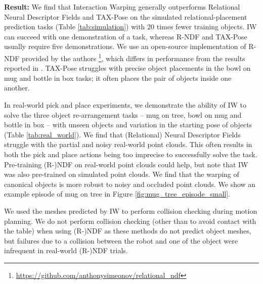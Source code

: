 \documentclass{article}
\newcommand{\ob}[1]{\textcolor{purple}{[\textbf{OB:} #1]}}
\begin{document}
\textbf{Result:} We find that Interaction Warping generally outperforms Relational Neural Descriptor Fields \cite{simeonov2022neural} and TAX-Pose \cite{pan22taxpose} on the simulated relational-placement prediction tasks (Table \ref{tab:simulation}) with 20 times fewer training objects. IW can succeed with one demonstration of a task, whereas R-NDF and TAX-Pose usually require five demonstrations. We use an open-source implementation of R-NDF provided by the authors \footnote{\url{https://github.com/anthonysimeonov/relational_ndf}}, which differs in performance from the results reported in \cite{simeonov22se}. TAX-Pose struggles with precise object placements in the bowl on mug and bottle in box tasks; it often places the pair of objects inside one another.

In real-world pick and place experiments, we demonstrate the ability of IW to solve the three object re-arrangement tasks -- mug on tree, bowl on mug and bottle in box -- with unseen objects and variation in the starting pose of objects (Table \ref{tab:real_world}). We find that (Relational) Neural Descriptor Fields \cite{simeonov22neural,simeonov22se} struggle with the partial and noisy real-world point clouds. This often results in both the pick and place actions being too imprecise to successfully solve the task. Pre-training (R-)NDF on real-world point clouds could help, but note that IW was also pre-trained on simulated point clouds. We find that the warping of canonical objects is more robust to noisy and occluded point clouds. We show an example episode of mug on tree in Figure \ref{fig:mug_tree_episode_small}.

We used the meshes predicted by IW to perform collision checking during motion planning. We do not perform collision checking (other than to avoid contact with the table) when using (R-)NDF as these methods do not predict object meshes, but failures due to a collision between the robot and one of the object were infrequent in real-world (R-)NDF trials.

\end{document}
